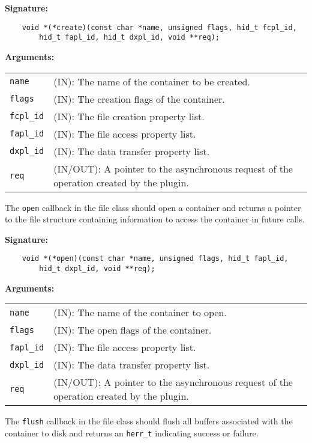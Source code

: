 \textbf{Signature:}
\begin{lstlisting}
    void *(*create)(const char *name, unsigned flags, hid_t fcpl_id,
        hid_t fapl_id, hid_t dxpl_id, void **req);
\end{lstlisting}

\textbf{Arguments:}\\
\begin{tabular}{l p{10cm}}
  {\tt name} & (IN): The name of the container to be created.\\
  {\tt flags} & (IN): The creation flags of the container.\\
  {\tt fcpl\_id} & (IN): The file creation property list.\\
  {\tt fapl\_id} & (IN): The file access property list.\\
  {\tt dxpl\_id} & (IN): The data transfer property list.\\
  {\tt req} & (IN/OUT): A pointer to the asynchronous request of the
  operation created by the plugin.\\
\end{tabular}

The {\tt open} callback in the file class should open a container and
returns a pointer to the file structure containing information to
access the container in future calls.

\textbf{Signature:}
\begin{lstlisting}
    void *(*open)(const char *name, unsigned flags, hid_t fapl_id, 
        hid_t dxpl_id, void **req);
\end{lstlisting}

\textbf{Arguments:}\\
\begin{tabular}{l p{10cm}}
  {\tt name} & (IN): The name of the container to open.\\
  {\tt flags} & (IN): The open flags of the container.\\
  {\tt fapl\_id} & (IN): The file access property list.\\
  {\tt dxpl\_id} & (IN): The data transfer property list.\\
  {\tt req} & (IN/OUT): A pointer to the asynchronous request of the
  operation created by the plugin.\\
\end{tabular}

The {\tt flush} callback in the file class should flush all buffers
associated with the container to disk and returns an {\tt herr\_t}
indicating success or failure.

